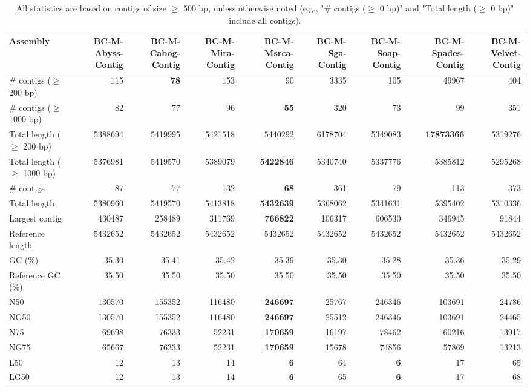 \documentclass[12pt,a4paper]{article}
\begin{document}
\begin{table}[ht]
\begin{center}
\caption{All statistics are based on contigs of size $\geq$ 500 bp, unless otherwise noted (e.g., "\# contigs ($\geq$ 0 bp)" and "Total length ($\geq$ 0 bp)" include all contigs).}
\begin{tabular}{|l*{8}{|r}|}
\hline
Assembly & BC-M-Abyss-Contig & BC-M-Cabog-Contig & BC-M-Mira-Contig & BC-M-Msrca-Contig & BC-M-Sga-Contig & BC-M-Soap-Contig & BC-M-Spades-Contig & BC-M-Velvet-Contig \\ \hline
\# contigs ($\geq$ 200 bp) & 115 & {\bf 78} & 153 & 90 & 3335 & 105 & 49967 & 404 \\ \hline
\# contigs ($\geq$ 1000 bp) & 82 & 77 & 96 & {\bf 55} & 320 & 73 & 99 & 351 \\ \hline
Total length ($\geq$ 200 bp) & 5388694 & 5419995 & 5421518 & 5440292 & 6178704 & 5349083 & {\bf 17873366} & 5319276 \\ \hline
Total length ($\geq$ 1000 bp) & 5376981 & 5419570 & 5389079 & {\bf 5422846} & 5340740 & 5337776 & 5385812 & 5295268 \\ \hline
\# contigs & 87 & 77 & 132 & {\bf 68} & 361 & 79 & 113 & 373 \\ \hline
Total length & 5380960 & 5419570 & 5413818 & {\bf 5432639} & 5368062 & 5341631 & 5395402 & 5310336 \\ \hline
Largest contig & 430487 & 258489 & 311769 & {\bf 766822} & 106317 & 606530 & 346945 & 91844 \\ \hline
Reference length & 5432652 & 5432652 & 5432652 & 5432652 & 5432652 & 5432652 & 5432652 & 5432652 \\ \hline
GC (\%) & 35.30 & 35.41 & 35.42 & 35.39 & 35.30 & 35.28 & 35.36 & 35.29 \\ \hline
Reference GC (\%) & 35.50 & 35.50 & 35.50 & 35.50 & 35.50 & 35.50 & 35.50 & 35.50 \\ \hline
N50 & 130570 & 155352 & 116480 & {\bf 246697} & 25767 & 246346 & 103691 & 24786 \\ \hline
NG50 & 130570 & 155352 & 116480 & {\bf 246697} & 25512 & 246346 & 103691 & 24465 \\ \hline
N75 & 69698 & 76333 & 52231 & {\bf 170659} & 16197 & 78462 & 60216 & 13917 \\ \hline
NG75 & 65667 & 76333 & 52231 & {\bf 170659} & 15678 & 74856 & 57869 & 13213 \\ \hline
L50 & 12 & 13 & 14 & {\bf 6} & 64 & {\bf 6} & 17 & 65 \\ \hline
LG50 & 12 & 13 & 14 & {\bf 6} & 65 & {\bf 6} & 17 & 68 \\ \hline

\end{tabular}
\end{center}
\end{table}
\end{document}

